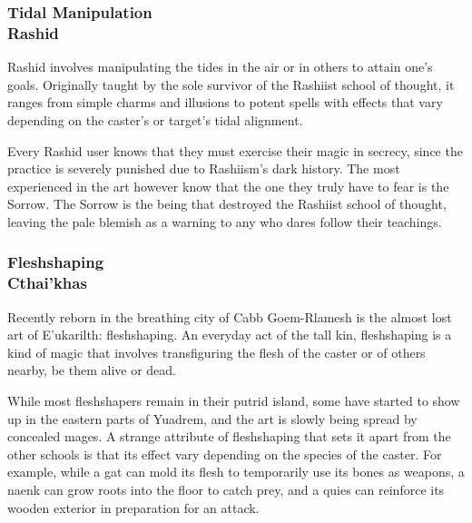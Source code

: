 \subsubsection{Tidal Manipulation\\ \small{Rashid}} %
Rashid involves manipulating the tides in the air or in others to attain one's goals.
Originally taught by the sole survivor of the Rashiist school of thought, it ranges from simple charms and illusions to potent spells with effects that vary depending on the caster's or target's tidal alignment.

Every Rashid user knows that they must exercise their magic in secrecy, since the practice is severely punished due to Rashiism's dark history.
The most experienced in the art however know that the one they truly have to fear is the Sorrow.
The Sorrow is the being that destroyed the Rashiist school of thought, leaving the pale blemish as a warning to any who dares follow their teachings.

\subsubsection{Fleshshaping\\ \small{Cthai'khas}} %
Recently reborn in the breathing city of Cabb Goem-Rlamesh is the almost lost art of E'ukarilth: fleshshaping.
An everyday act of the tall kin, fleshshaping is a kind of magic that involves transfiguring the flesh of the caster or of others nearby, be them alive or dead.

While most fleshshapers remain in their putrid island, some have started to show up in the eastern parts of Yuadrem, and the art is slowly being spread by concealed mages.
A strange attribute of fleshshaping that sets it apart from the other schools is that its effect vary depending on the species of the caster.
For example, while a gat can mold its flesh to temporarily use its bones as weapons, a naenk can grow roots into the floor to catch prey, and a quies can reinforce its wooden exterior in preparation for an attack.
